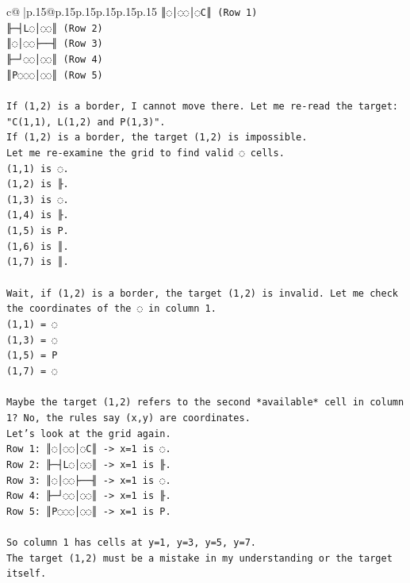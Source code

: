 \documentclass{article}
\begin{document}
{\begin{supertabular}{c@{$\;$}|p{.15\linewidth}@{}p{.15\linewidth}p{.15\linewidth}p{.15\linewidth}p{.15\linewidth}p{.15\linewidth}}
{{{\texttt{║◌│◌◌│◌C║ (Row 1)} \\
\texttt{╟─┤L◌│◌◌║ (Row 2)} \\
\texttt{║◌│◌◌├──╢ (Row 3)} \\
\texttt{╟─┘◌◌│◌◌║ (Row 4)} \\
\texttt{║P◌◌◌│◌◌║ (Row 5)} \\
\\ 
\texttt{If (1,2) is a border, I cannot move there. Let me re{-}read the target: "C(1,1), L(1,2) and P(1,3)".} \\
\texttt{If (1,2) is a border, the target (1,2) is impossible.} \\
\texttt{Let me re{-}examine the grid to find valid ◌ cells.} \\
\texttt{(1,1) is ◌.} \\
\texttt{(1,2) is ╟.} \\
\texttt{(1,3) is ◌.} \\
\texttt{(1,4) is ╟.} \\
\texttt{(1,5) is P.} \\
\texttt{(1,6) is ║.} \\
\texttt{(1,7) is ║.} \\
\\ 
\texttt{Wait, if (1,2) is a border, the target (1,2) is invalid. Let me check the coordinates of the ◌ in column 1.} \\
\texttt{(1,1) = ◌} \\
\texttt{(1,3) = ◌} \\
\texttt{(1,5) = P} \\
\texttt{(1,7) = ◌} \\
\\ 
\texttt{Maybe the target (1,2) refers to the second *available* cell in column 1? No, the rules say (x,y) are coordinates.} \\
\texttt{Let's look at the grid again.} \\
\texttt{Row 1: ║◌│◌◌│◌C║ {-}> x=1 is ◌.} \\
\texttt{Row 2: ╟─┤L◌│◌◌║ {-}> x=1 is ╟.} \\
\texttt{Row 3: ║◌│◌◌├──╢ {-}> x=1 is ◌.} \\
\texttt{Row 4: ╟─┘◌◌│◌◌║ {-}> x=1 is ╟.} \\
\texttt{Row 5: ║P◌◌◌│◌◌║ {-}> x=1 is P.} \\
\\ 
\texttt{So column 1 has cells at y=1, y=3, y=5, y=7.} \\
\texttt{The target (1,2) must be a mistake in my understanding or the target itself.} \\
}}}
\end{supertabular}}
\end{document}
